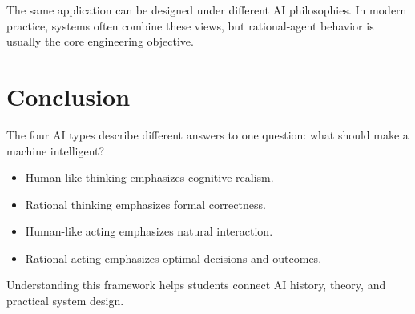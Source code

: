 \documentclass[12pt,a4paper]{article}
\begin{document}
\begin{insightbox}
The same application can be designed under different AI philosophies.
In modern practice, systems often combine these views, but rational-agent behavior is usually the core engineering objective.
\end{insightbox}

\section{Conclusion}

The four AI types describe different answers to one question: what should make a machine intelligent?

\begin{itemize}[noitemsep]
    \item Human-like thinking emphasizes cognitive realism.
    \item Rational thinking emphasizes formal correctness.
    \item Human-like acting emphasizes natural interaction.
    \item Rational acting emphasizes optimal decisions and outcomes.
\end{itemize}

Understanding this framework helps students connect AI history, theory, and practical system design.
\end{document}
